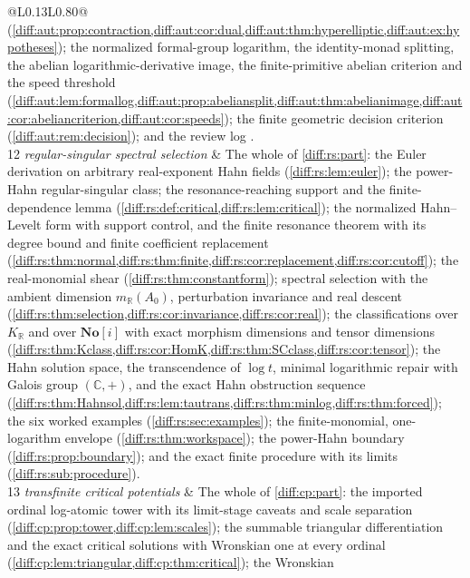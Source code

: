 \documentclass[11pt,letterpaper]{article}
\numberwithin{equation}{section}
\theoremstyle{definition}
\theoremstyle{remark}
\newcommand{\SC}{\mathbf{No}[i]}
\newcommand{\R}{\mathbb R}
\newcommand{\C}{\mathbb C}
\newcommand{\KR}{K_{\R}}
\begin{document}
\begin{longtable}{@{}L{0.13\textwidth}L{0.80\textwidth}@{}}
(\cref{diff:aut:prop:contraction,diff:aut:cor:dual,diff:aut:thm:hyperelliptic,diff:aut:ex:hypotheses});
the normalized formal-group logarithm, the identity-monad splitting, the abelian
logarithmic-derivative image, the finite-primitive abelian criterion and the
speed threshold
(\cref{diff:aut:lem:formallog,diff:aut:prop:abeliansplit,diff:aut:thm:abelianimage,diff:aut:cor:abeliancriterion,diff:aut:cor:speeds});
the finite geometric decision criterion (\cref{diff:aut:rem:decision}); and the
review log . \\[0.3em]
12 \newline\emph{regular-singular spectral selection} &
The whole of \cref{diff:rs:part}: the Euler derivation on arbitrary real-exponent
Hahn fields (\cref{diff:rs:lem:euler}); the power-Hahn regular-singular class;
the resonance-reaching support and the finite-dependence lemma
(\cref{diff:rs:def:critical,diff:rs:lem:critical}); the normalized Hahn--Levelt
form with support control, and the finite resonance theorem with its degree bound
and finite coefficient replacement
(\cref{diff:rs:thm:normal,diff:rs:thm:finite,diff:rs:cor:replacement,diff:rs:cor:cutoff});
the real-monomial shear (\cref{diff:rs:thm:constantform}); spectral selection with
the ambient dimension $m_{\R}(A_{0})$, perturbation invariance and real descent
(\cref{diff:rs:thm:selection,diff:rs:cor:invariance,diff:rs:cor:real}); the
classifications over $\KR$ and over $\SC$ with exact morphism dimensions and
tensor dimensions
(\cref{diff:rs:thm:Kclass,diff:rs:cor:HomK,diff:rs:thm:SCclass,diff:rs:cor:tensor});
the Hahn solution space, the transcendence of $\log t$, minimal logarithmic
repair with Galois group $(\C,+)$, and the exact Hahn obstruction sequence
(\cref{diff:rs:thm:Hahnsol,diff:rs:lem:tautrans,diff:rs:thm:minlog,diff:rs:thm:forced});
the six worked examples (\cref{diff:rs:sec:examples}); the finite-monomial,
one-logarithm envelope (\cref{diff:rs:thm:workspace}); the power-Hahn boundary
(\cref{diff:rs:prop:boundary}); and the exact finite procedure with its limits
(\cref{diff:rs:sub:procedure}). \\[0.3em]
13 \newline\emph{transfinite critical potentials} &
The whole of \cref{diff:cp:part}: the imported ordinal log-atomic tower with its
limit-stage caveats and scale separation
(\cref{diff:cp:prop:tower,diff:cp:lem:scales}); the summable triangular
differentiation and the exact critical solutions with Wronskian one at every
ordinal (\cref{diff:cp:lem:triangular,diff:cp:thm:critical}); the Wronskian

\end{longtable}
\end{document}
